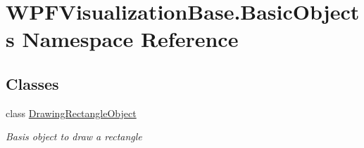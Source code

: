 \hypertarget{namespace_w_p_f_visualization_base_1_1_basic_objects}{}\section{W\+P\+F\+Visualization\+Base.\+Basic\+Objects Namespace Reference}
\label{namespace_w_p_f_visualization_base_1_1_basic_objects}
\subsection*{Classes}
\begin{DoxyCompactItemize}
\item 
class \hyperlink{class_w_p_f_visualization_base_1_1_basic_objects_1_1_drawing_rectangle_object}{Drawing\+Rectangle\+Object}
\begin{DoxyCompactList}\small\item\em Basis object to draw a rectangle \end{DoxyCompactList}\end{DoxyCompactItemize}
